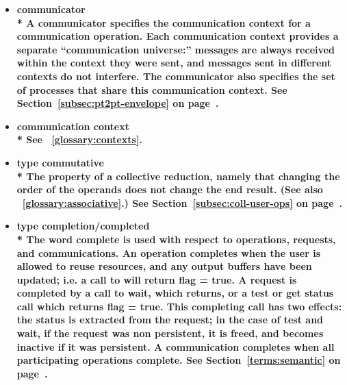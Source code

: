 \begin{itemize}
\label{glossary:communicator}
\item \bf{ communicator} \\*
A communicator specifies the
communication context for a communication operation.
Each communication context provides a separate ``communication
universe:'' messages are always received within the context they were
sent, and messages sent in different contexts do not interfere.
The communicator also specifies the set of processes that share this
communication context. 
See Section~\ref{subsec:pt2pt-envelope} on page~\pageref{subsec:pt2pt-envelope}.

\label{glossary:communication context}
\item \bf{ communication context} \\*
See ~\ref{glossary:contexts}.

\label{glossary:commutative}
\item \bf{ type commutative} \\*
The property of a collective reduction, namely that changing the order of the operands does not change the end result. 
(See also ~\ref{glossary:associative}.)
See Section~\ref{subsec:coll-user-ops} on page~\pageref{subsec:coll-user-ops}.

\label{glossary:completion/completed}
\item \bf{ type completion/completed} \\*
The word complete is used with respect to operations, requests, and communications. 
An operation completes when the user is allowed to reuse resources, and any output 
buffers have been updated; i.e. a call to  will return flag = true. A request is 
completed by a call to wait, which returns, or a test or get status call which returns flag = true. 
This completing call has two effects: the status is extracted from the request; in the case 
of test and wait, if the request was non persistent, it is freed, and becomes inactive if it 
was persistent. A communication completes when all participating operations complete.
See Section~\ref{terms:semantic} on page~\pageref{terms:semantic}.



\end{itemize}
